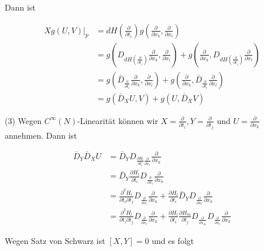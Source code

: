 \documentclass[10pt]{article}
\begin{document}
Dann ist

$$
\begin{aligned}
\left.X g(U, V)\right|_{p} & =d H\left(\frac{\partial}{\partial t_{i}}\right) g\left(\frac{\partial}{\partial x_{k}}, \frac{\partial}{\partial x_{l}}\right) \\
& =g\left(D_{d H\left(\frac{\partial}{\partial t_{i}}\right)} \frac{\partial}{\partial x_{k}}, \frac{\partial}{\partial x_{l}}\right)+g\left(\frac{\partial}{\partial x_{k}}, D_{d H\left(\frac{\partial}{\partial t_{i}}\right)} \frac{\partial}{\partial x_{l}}\right) \\
& =g\left(\bar{D}_{\frac{\partial}{\partial t_{i}}} \frac{\partial}{\partial x_{k}}, \frac{\partial}{\partial x_{l}}\right)+g\left(\frac{\partial}{\partial x_{k}}, \bar{D}_{\frac{\partial}{\partial t_{i}}} \frac{\partial}{\partial x_{l}}\right) \\
& =g\left(\bar{D}_{X} U, V\right)+g\left(U, \bar{D}_{X} V\right)
\end{aligned}
$$

(3) Wegen $C^{\infty}(N)$-Linearität können wir $X=\frac{\partial}{\partial t_{i}}, Y=\frac{\partial}{\partial t_{j}}$ und $U=\frac{\partial}{\partial x_{k}}$ annehmen. Dann ist

$$
\begin{aligned}
\bar{D}_{Y} \bar{D}_{X} U & =\bar{D}_{Y} D_{\frac{\partial H_{l}}{\partial t_{i}} \frac{\partial}{\partial x_{l}}} \frac{\partial}{\partial x_{k}} \\
& =\bar{D}_{Y} \frac{\partial H_{l}}{\partial t_{i}} D_{\frac{\partial}{\partial x_{l}}} \frac{\partial}{\partial x_{k}} \\
& =\frac{\partial^{2} H_{l}}{\partial t_{i} \partial t_{j}} D_{\frac{\partial}{\partial x_{l}}} \frac{\partial}{\partial x_{k}}+\frac{\partial H_{l}}{\partial t_{i}} \bar{D}_{Y} D_{\frac{\partial}{\partial x_{l}}} \frac{\partial}{\partial x_{k}} \\
& =\frac{\partial^{2} H_{l}}{\partial t_{i} \partial t_{j}} D_{\frac{\partial}{\partial x_{l}}} \frac{\partial}{\partial x_{k}}+\frac{\partial H_{l}}{\partial t_{i}} \frac{\partial H_{m}}{\partial t_{j}} D_{\frac{\partial}{\partial x_{m}}} D_{\frac{\partial}{\partial x_{l}}} \frac{\partial}{\partial x_{k}}
\end{aligned}
$$

Wegen Satz von Schwarz ist $[X, Y]=0$ und es folgt
\end{document}
